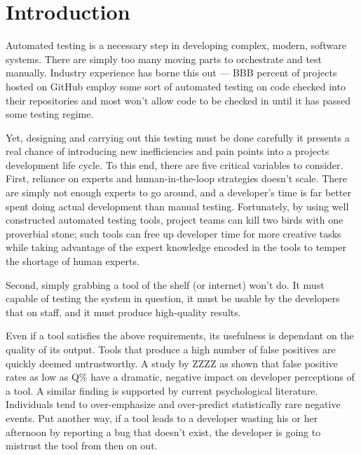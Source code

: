 \section{Introduction}
\label{SEC:introduction}


 Automated testing
is a necessary step in developing complex, modern, software systems.  There
are simply too many moving parts to orchestrate and test manually.
Industry experience has borne this out --- BBB percent of projects hosted
on GitHub employ some sort of automated testing on code checked into their
repositories and most won't allow code to be checked in until it has passed
some testing regime.

Yet, designing and carrying out this testing must be done carefully it
presents a real chance of introducing new inefficiencies and pain points
into a projects development life cycle.  To this end, there are five
critical variables to consider.  First, reliance on experts and
human-in-the-loop strategies doesn't scale.  There are
simply not enough experts to go around, and a developer's time is far
better spent doing actual development than manual testing.  Fortunately, by using well constructed automated
testing tools, project teams can kill two birds with one proverbial stone;
such tools can free up developer time for more creative tasks while taking
advantage of the expert knowledge encoded in the tools to temper the
shortage of human experts.


Second, simply grabbing a tool of the shelf (or internet) won't do.  It
must capable of testing the system in question, it must be usable by the
developers that on staff, and it must produce high-quality results.

Even if a tool satisfies the above requirements, its usefulness is
dependant on the quality of its output.  Tools that produce a high number
of false positives are quickly deemed untrustworthy.  A study by ZZZZ as
shown that false positive rates as low as Q\% have a dramatic, negative
impact on developer perceptions of a tool.    A similar
finding is supported by current psychological literature.  Individuals tend
to over-emphasize and over-predict statistically rare negative
events.  Put another way, if a tool leads to a developer
wasting his or her afternoon by reporting a bug that doesn't exist, the
developer is going to mistrust the tool from then on out.

